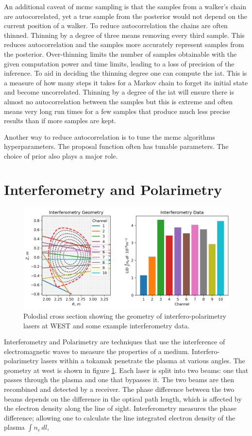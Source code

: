 An additional caveat of \gls{mcmc} sampling is that the samples from a walker's chain are autocorrelated, yet a true sample from the posterior would not depend on the current position of a walker. To reduce autocorrelation the chains are often thinned. Thinning by a degree of three means removing every third sample. This reduces autocorrelation and the samples more accurately represent samples from the posterior. Over-thinning limits the number of samples obtainable with the given computation power and time limits, leading to a loss of precision of the inference. To aid in deciding the thinning degree one can compute the \gls{iat}. This is a measure of how many steps it takes for a Markov chain to forget its initial state and become uncorrelated. Thinning by a degree of the \gls{iat} will ensure there is almost no autocorrelation between the samples but this is extreme and often means very long run times for a few samples that produce much less precise results than if more samples are kept.

Another way to reduce autocorrelation is to tune the \gls{mcmc} algorithms hyperparameters. The proposal function often has tunable parameters. The choice of prior also plays a major role.

\section{Interferometry and Polarimetry}

\begin{figure}[H]
  \centering
  \includegraphics[width=15cm]{images/54344_7s_interf.png}
  \caption{Polodial cross section showing the geometry of interfero-polarimetry lasers at WEST \cite{westinterfero} and some example interferometry data.}
  \label{fig:interfgeo}
\end{figure}

Interferometry and Polarimetry are techniques that use the interference of electromagnetic waves to measure the properties of a medium. Interfero-polarimetry lasers within a tokamak penetrate the plasma at various angles. The geometry at \gls{west} is shown in figure \ref{fig:interfgeo}. Each laser is split into two beams: one that passes through the plasma and one that bypasses it. The two beams are then recombined and detected by a receiver. The phase difference between the two beams depends on the difference in the optical path length, which is affected by the electron density along the line of sight. Interferometry measures the phase difference; allowing one to calculate the line integrated electron density of the plasma $\int n_e \, dl$, 

